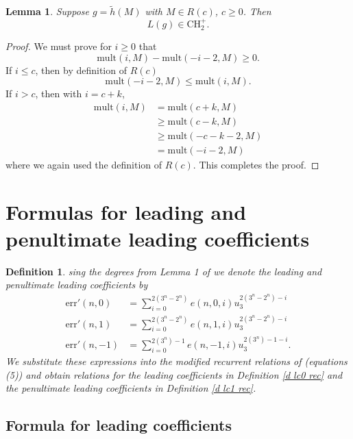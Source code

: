 \documentclass[11pt, oneside]{article}   	%
\newtheorem{lemma}{Lemma}
\newtheorem{definition}{Definition}
\newcommand{\err}{\mathrm{err}}
\newcommand{\ti}{\tilde{h}}
\newcommand{\mult}{\mathrm{mult}}
\newcommand{\CH}{\mathrm{CH}_2}
\begin{document}
\begin{lemma} \label{l pos}
Suppose $g = \ti(M)$ with $M\in R(c)$, $c \geq 0$. Then
\[
L(g) \in \CH^+.
\]
\end{lemma}
\begin{proof}

We must prove for $i \geq 0$ that 
\[
\mult(i,M) - \mult(-i-2,M) \geq 0.
\]
If $i \leq c$, then by definition of $R(c)$
\[
\mult(-i-2,M)  \leq \mult(i,M).
\]
If $i > c$, then with $i = c+k$, 
\begin{align*}
 \mult(i,M) &= \mult(c+k,M) \\ 
 &\geq \mult(c-k,M) \\
 &\geq \mult(-c-k-2,M)\\ 
  &=  \mult(-i-2,M)
 \end{align*}
 where we again used the definition of $R(c)$. This completes the proof. 
\end{proof}


\section{Formulas for leading and penultimate leading coefficients} \label{s formulas}

\begin{definition}

sing the degrees from  Lemma 1 of \cite{DeFranco} we denote the leading and penultimate leading coefficients by 
\begin{align*}
\err'(n,0) &= \sum_{i=0}^{2(3^n-2^n)} e(n,0,i)u_3^{2(3^n-2^n)-i} \\ 
\err'(n,1) &= \sum_{i=0}^{2(3^n-2^n)} e(n,1,i)u_3^{2(3^n-2^n)-i}\\ 
\err'(n,-1) &= \sum_{i=0}^{2(3^n)-1} e(n,-1,i)u_3^{2(3^n)-1-i}.
\end{align*}
We substitute these expressions into the modified recurrent relations of \cite{DeFranco} (equations (5)) and obtain relations for the leading coefficients in Definition \ref{d lc0 rec} and the penultimate leading coefficients in Definition \ref{d lc1 rec}.
\end{definition} 

\subsection{Formula for leading coefficients} 
\end{document}
